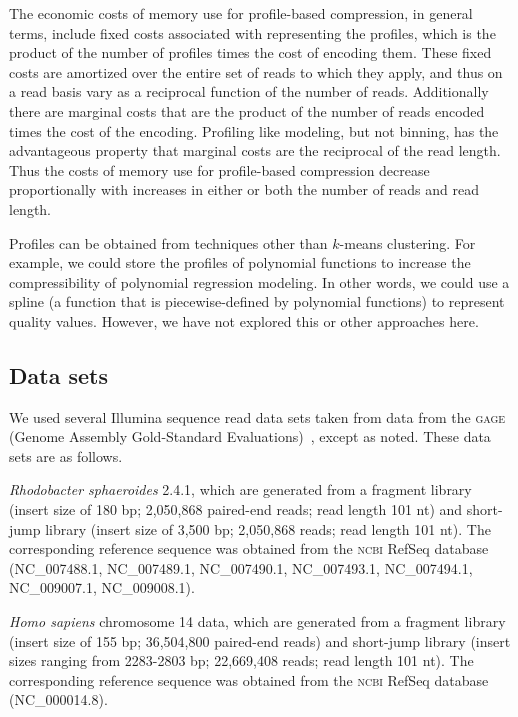 \documentclass{bioinfo}
\begin{document}
\begin{methods}
The economic costs of memory use for profile-based compression, in
general terms, include fixed costs associated with representing the
profiles, which is the product of the number of profiles times the
cost of encoding them. These fixed costs are amortized over the entire
set of reads to which they apply, and thus on a read basis vary as a
reciprocal function of the number of reads. Additionally there are
marginal costs that are the product of the number of reads encoded
times the cost of the encoding. Profiling like modeling, but not
binning, has the advantageous property that marginal costs are the
reciprocal of the read length. Thus the costs of memory use for
profile-based compression decrease proportionally with increases in
either or both the number of reads and read length.

Profiles can be obtained from techniques other than $k$-means
clustering. For example, we could store the profiles of polynomial
functions to increase the compressibility of polynomial regression
modeling. In other words, we could use a spline (a function that is
piecewise-defined by polynomial functions) to represent quality
values. However, we have not explored this or other approaches here.

\subsection{Data sets}

We used several Illumina sequence read data sets taken from data from
the \textsc{gage} (Genome Assembly Gold-Standard
Evaluations)~\citep{Salzberg:2012rc}, except as noted. These data sets
are as follows.

\textit{Rhodobacter sphaeroides} 2.4.1, which are generated from a
fragment library (insert size of 180 bp; 2,050,868 paired-end reads;
read length 101 nt) and short-jump library (insert size of 3,500 bp;
2,050,868 reads; read length 101 nt). The corresponding reference
sequence was obtained from the \textsc{ncbi} RefSeq database
(NC\_007488.1, NC\_007489.1, NC\_007490.1, NC\_007493.1, NC\_007494.1,
NC\_009007.1, NC\_009008.1).

\textit{Homo sapiens} chromosome 14 data, which are generated from a
fragment library (insert size of 155 bp; 36,504,800 paired-end reads)
and short-jump library (insert sizes ranging from 2283-2803 bp;
22,669,408 reads; read length 101 nt). The corresponding reference
sequence was obtained from the \textsc{ncbi} RefSeq database
(NC\_000014.8).


\end{methods}
\end{document}
